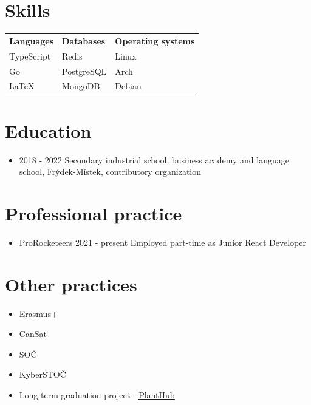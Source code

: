 \documentclass[12pt,a4paper]{article}
\begin{document}
\section*{Skills}

\begin{center}
  \begin{tabular}{ l l l }
    \textbf{\large Languages} & \textbf{\large Databases} & \textbf{\large Operating systems}
    \\
    TypeScript            & Redis                    & Linux
    \\
    Go                    & PostgreSQL               & Arch
    \\
    LaTeX                 & MongoDB                  & Debian
    \\
  \end{tabular}
\end{center}

\section*{Education}

\begin{itemize}
  \item 2018 - 2022 Secondary industrial school, business academy and
  language school,
  Frýdek-Místek, contributory organization
\end{itemize}

\section*{Professional practice}
\begin{itemize}
  \item \underline{\href{https://www.prorocketeers.com/}{ProRocketeers}} 2021 - present
        \subitem Employed part-time as Junior React Developer
\end{itemize}

\section*{Other practices}

\begin{itemize}
  \item Erasmus+
  \item CanSat
  \item SOČ
  \item KyberSTOČ
  \item Long-term graduation project - \underline{\href{https://github.com/POJFM/dmp-plant-hub}{PlantHub}}
\end{itemize}
\end{document}
